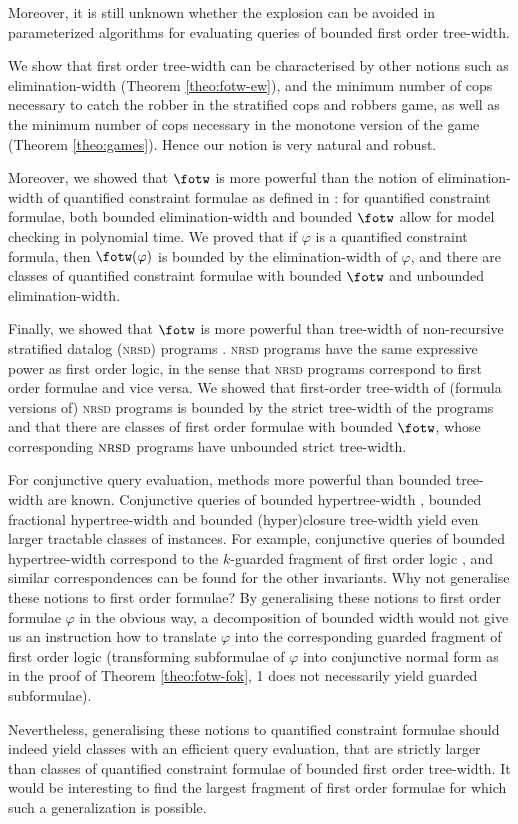\documentclass{LMCS}
\newcommand{\nrsd}{\textsc{nrsd}}
\renewcommand{\phi}{\varphi}
\begin{document}
Moreover, it is still unknown whether the explosion can be avoided 
in parameterized algorithms 
for evaluating queries of bounded first order tree-width. 


We show that first order tree-width can be characterised by other notions
such as elimination-width (Theorem \ref{theo:fotw-ew}), and the minimum number
of cops necessary to catch the robber in the stratified cops and robbers
game, as well as the minimum number of cops necessary in the monotone
version of the game (Theorem \ref{theo:games}). Hence our notion is very natural
and robust. 

Moreover, we showed that $\fotw$ is more powerful than the notion of
elimination-width 
of quantified constraint formulae as defined in \cite{chedal05}:
for quantified constraint formulae, both bounded elimination-width
and bounded $\fotw$ allow for model checking in polynomial time.
We proved that if $\phi$ is a quantified constraint formula, then
$\fotw(\phi)$ is bounded by the elimination-width of $\phi$, and
there are classes of quantified constraint formulae
with bounded $\fotw$ and unbounded elimination-width.

Finally, we showed that $\fotw$ is more powerful than   
tree-width of non-recursive stratified datalog (\nrsd) programs \cite{flufrigro01}.
\nrsd{} programs have the same
expressive power as first order logic, in the sense that \nrsd{} programs correspond
to first order formulae and vice versa.
We showed 
that first-order tree-width of (formula versions of) \nrsd{} programs 
is bounded by the strict tree-width of the programs 
and that there are classes of first order formulae with bounded $\fotw$,
whose corresponding $\nrsd$ programs have unbounded strict tree-width. 

For conjunctive query evaluation, methods more powerful than
bounded tree-width are known. Conjunctive queries of bounded hypertree-width 
\cite{gotleosca02},
bounded fractional hypertree-width \cite{gromar06} 
and bounded (hyper)closure tree-width \cite{Adler08}
yield even larger tractable classes of instances. 
For example, conjunctive queries of bounded hypertree-width
correspond to the $k$-guarded fragment of first order logic
\cite{gotleosca03}, and similar correspondences can be found for the
other invariants. Why not generalise these notions to first order
formulae? By generalising these
notions to first order formulae $\phi$ in the obvious way, a decomposition
of bounded width would not give us an instruction
how to translate $\phi$ into the corresponding guarded
fragment of first order logic (transforming subformulae of $\phi$
into conjunctive normal form as in the proof of
Theorem \ref{theo:fotw-fok}, 1 does not necessarily
yield guarded subformulae).

Nevertheless, generalising these notions to quantified constraint
formulae should indeed yield classes with an efficient query
evaluation, that are strictly larger than classes of quantified constraint
formulae of bounded first order tree-width. It would be interesting to find
the largest fragment of first order formulae 
for which such a generalization is possible. 

{


}
\end{document}
